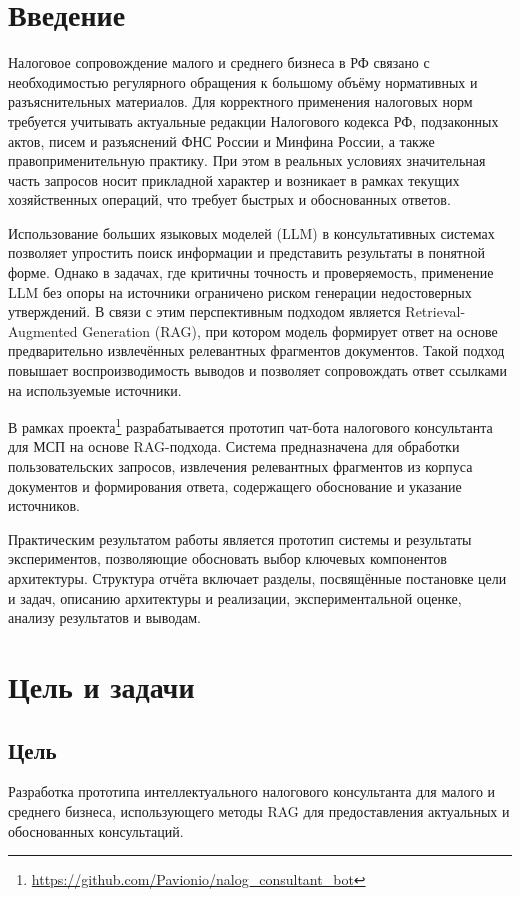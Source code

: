 \documentclass[a4paper,12pt]{article}
\begin{document}
\renewcommand{\contentsname}{Содержание}
\renewcommand{\tablename}{Таблица}
\tableofcontents

\newpage
\section{Введение}
\justifying
Налоговое сопровождение малого и среднего бизнеса в РФ связано с необходимостью регулярного обращения к большому объёму нормативных и разъяснительных материалов. Для корректного применения налоговых норм требуется учитывать актуальные редакции Налогового кодекса РФ, подзаконных актов, писем и разъяснений ФНС России и Минфина России, а также правоприменительную практику. При этом в реальных условиях значительная часть запросов носит прикладной характер и возникает в рамках текущих хозяйственных операций, что требует быстрых и обоснованных ответов.

Использование больших языковых моделей (LLM) в консультативных системах позволяет упростить поиск информации и представить результаты в понятной форме. Однако в задачах, где критичны точность и проверяемость, применение LLM без опоры на источники ограничено риском генерации недостоверных утверждений. В связи с этим перспективным подходом является Retrieval-Augmented Generation (RAG), при котором модель формирует ответ на основе предварительно извлечённых релевантных фрагментов документов. Такой подход повышает воспроизводимость выводов и позволяет сопровождать ответ ссылками на используемые источники.

В рамках проекта\footnote{\url{https://github.com/Pavionio/nalog_consultant_bot}} разрабатывается прототип чат-бота налогового консультанта для МСП на основе RAG-подхода. Система предназначена для обработки пользовательских запросов, извлечения релевантных фрагментов из корпуса документов и формирования ответа, содержащего обоснование и указание источников.

Практическим результатом работы является прототип системы и результаты экспериментов, позволяющие обосновать выбор ключевых компонентов архитектуры. Структура отчёта включает разделы, посвящённые постановке цели и задач, описанию архитектуры и реализации, экспериментальной оценке, анализу результатов и выводам.

\newpage
\section{Цель и задачи}

\subsection{Цель}
Разработка прототипа интеллектуального налогового консультанта для малого и среднего бизнеса, использующего методы RAG для предоставления актуальных и обоснованных консультаций.
\end{document}
